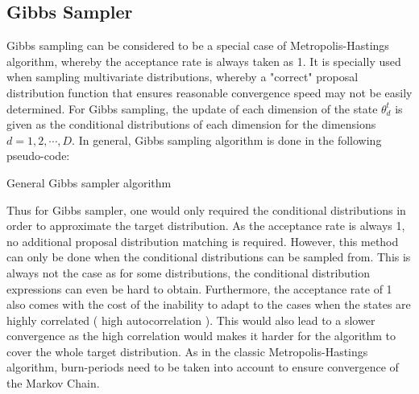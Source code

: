 \documentclass{usiinftr}
\begin{document}
\subsection{Gibbs Sampler} 
Gibbs sampling can be considered to be a special case of Metropolis-Hastings algorithm, whereby the acceptance rate is always taken as 1. It is specially used when sampling multivariate distributions, whereby a "correct" proposal distribution function that ensures reasonable convergence speed may not be easily determined. For Gibbs sampling, the update of each dimension of the state $\theta^{t}_d$ is given as the conditional distributions of each dimension for the dimensions $d = 1,2,\cdots,D$. In general, Gibbs sampling algorithm is done in the following pseudo-code:

\begin{algorithm}[h]
  \caption{General Gibbs sampler algorithm} \label{algGibbs}
  \begin{algorithmic}[1]
    \Statex
    	\State { $ \vdots $ }
    \EndFor
    \State \Return{$\theta$}
    \EndFunction
  \end{algorithmic}
\end{algorithm}

Thus for Gibbs sampler, one would only required the conditional distributions in order to approximate the 
target distribution. As the acceptance rate is always 1, no additional proposal distribution matching is required. However, this method can only be done when the conditional distributions can be sampled from. This is always not the case as for some distributions, the conditional distribution expressions can even be hard to obtain. Furthermore, the acceptance rate of 1 also comes with the cost of the inability to adapt to the cases when the states are highly correlated ( high autocorrelation ). This would also lead to a slower convergence as the high correlation would makes it harder for the algorithm to cover the whole target distribution. As in the classic Metropolis-Hastings algorithm, burn-periods need to be taken into account to ensure convergence of the Markov Chain.
\end{document}
